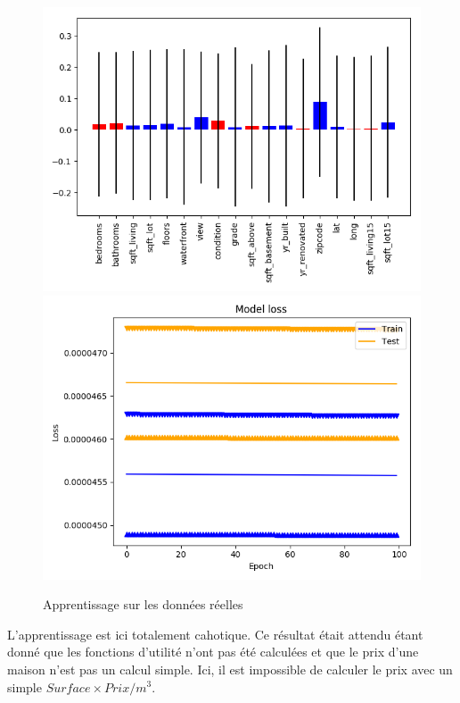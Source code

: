 \begin{figure}[H]
    \center
    \includegraphics[height=\petit]{pict/real/res1.png}
    \includegraphics[height=\petit]{pict/real/learn1.png}
	\caption{Apprentissage sur les données réelles}
	\label{fig:def_100_100}
\end{figure}
L'apprentissage est ici totalement cahotique.
Ce résultat était attendu étant donné que les fonctions d'utilité n'ont pas été
calculées et que le prix d'une maison n'est pas un calcul simple.
Ici, il est impossible de calculer le prix avec un simple $Surface \times Prix/m^3$.\\


